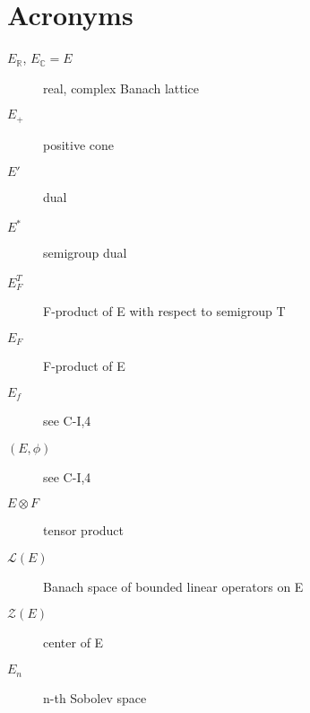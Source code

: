 


\chapter{Acronyms}

\begin{description}
\item[$E_{\mathbb{R}}$, $E_{\mathbb{C}} = E$] real, complex Banach lattice
\item[$E_{+}$] positive cone
\item[$E'$] dual
\item[$E^*$] semigroup dual
\item[$E_{F}^{T}$] F-product of E with respect to semigroup T
\item[$E_{F}$] F-product of E
\item[$E_{f}$] see C-I,4
\item[$(E,\phi)$] see C-I,4
\item[$E\otimes F$] tensor product
\item[$\mathcal{L}(E)$] Banach space of bounded linear operators on E
\item[$\mathcal{Z}(E)$] center of E
\item[$E_{n}$] n-th Sobolev space

\end{description}
